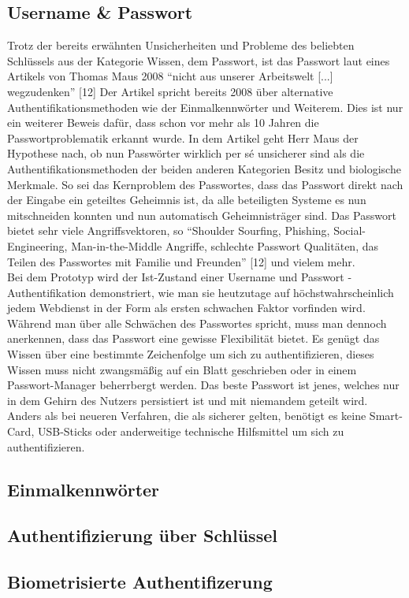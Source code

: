 \subsection{Username \& Passwort}
Trotz der bereits erwähnten Unsicherheiten und Probleme des beliebten Schlüssels aus der Kategorie Wissen, dem Passwort, ist das Passwort laut eines Artikels von Thomas Maus 2008 ``nicht aus unserer Arbeitswelt [...] wegzudenken'' [12] Der Artikel spricht bereits 2008 über alternative Authentifikationsmethoden wie der Einmalkennwörter und Weiterem. Dies ist nur ein weiterer Beweis dafür, dass schon vor mehr als 10 Jahren die Passwortproblematik erkannt wurde. In dem Artikel geht Herr Maus der Hypothese nach, ob nun Passwörter wirklich per sé unsicherer sind als die Authentifikationsmethoden der beiden anderen Kategorien Besitz und biologische Merkmale. So sei das Kernproblem des Passwortes, dass das Passwort direkt nach der Eingabe ein geteiltes Geheimnis ist, da alle beteiligten Systeme es nun mitschneiden konnten und nun automatisch Geheimnisträger sind. Das Passwort bietet sehr viele Angriffsvektoren, so ``Shoulder Sourfing, Phishing, Social-Engineering, Man-in-the-Middle Angriffe, schlechte Passwort Qualitäten, das Teilen des Passwortes mit Familie und Freunden'' [12] und vielem mehr. \\
Bei dem Prototyp wird der Ist-Zustand einer Username und Passwort - Authentifikation demonstriert, wie man sie heutzutage auf höchstwahrscheinlich jedem Webdienst in der Form als ersten schwachen Faktor vorfinden wird. Während man über alle Schwächen des Passwortes spricht, muss man dennoch anerkennen, dass das Passwort eine gewisse Flexibilität bietet. Es genügt das Wissen über eine bestimmte Zeichenfolge um sich zu authentifizieren, dieses Wissen muss nicht zwangsmäßig auf ein Blatt geschrieben oder in einem Passwort-Manager beherrbergt werden. Das beste Passwort ist jenes, welches nur in dem Gehirn des Nutzers persistiert ist und mit niemandem geteilt wird. Anders als bei neueren Verfahren, die als sicherer gelten, benötigt es keine Smart-Card, USB-Sticks oder anderweitige technische Hilfsmittel um sich zu authentifizieren.
\subsection{Einmalkennwörter}
\subsection{Authentifizierung über Schlüssel}
\subsection{Biometrisierte Authentifizerung}
